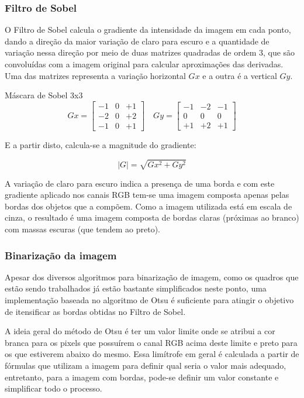 \documentclass{sciposter}
\begin{document}
\begin{multicols}{3}
\subsubsection{Filtro de Sobel}

O Filtro de Sobel calcula o gradiente da intensidade da imagem em cada ponto, dando a direção da maior variação de claro para escuro e a quantidade de variação nessa direção por meio de duas matrizes quadradas de ordem 3, que são convoluídas com a imagem original para calcular aproximações das derivadas. Uma das matrizes representa a variação horizontal $Gx$ e a outra é a vertical $Gy$. \\

\begin{center}{Máscara de Sobel 3x3}
$$
Gx=\left[\begin{array}{rrr}
-1&0&+1\\
-2&0&+2 \\
-1&0&+1
\end{array}\right]\quad
Gy=\left[\begin{array}{ccc}
-1&-2&-1\\
0& 0& 0 \\
+1&+2&+1
\end{array}\right]
$$
\end{center}

E a partir disto, calcula-se a magnitude do gradiente:

$$
|G|=\sqrt{Gx^2 + Gy^2}
$$	

A variação de claro para escuro indica a presença de uma borda e com este gradiente aplicado nos canais RGB tem-se uma imagem composta apenas pelas bordas dos objetos que a compõem. Como a imagem utilizada está em escala de cinza, o resultado é uma imagem composta de bordas claras (próximas ao branco) com massas escuras (que tendem ao preto).

\subsubsection{Binarização da imagem}

Apesar dos diversos algoritmos para binarização de imagem, como os quadros que estão sendo trabalhados já estão bastante simplificados neste ponto, uma implementação baseada no algoritmo de Otsu é suficiente para atingir o objetivo de itensificar as bordas obtidas no Filtro de Sobel.

A ideia geral do método de Otsu é ter um valor limite onde se atribui a cor branca para os pixels que possuírem o canal RGB acima deste limite e preto para os que estiverem abaixo do mesmo. Essa limítrofe em geral é calculada a partir de fórmulas que utilizam a imagem para definir qual seria o valor mais adequado, entretanto, para a imagem com bordas, pode-se definir um valor constante e simplificar todo o processo.


\end{multicols}
\end{document}
